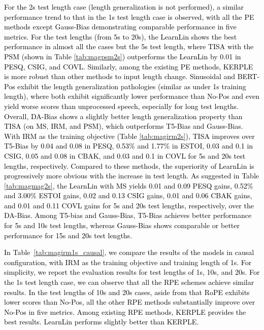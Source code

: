 \documentclass[journal]{IEEEtran}
\begin{document}
\textcolor{black}{\textcolor{black}{For the 2s test length case (length generalization is not performed), a similar performance trend to that in the 1s test length case is observed, with all the PE methods except Gauss-Bias demonstrating comparable performance in five metrics.} For the test lengths (from 5s to 20s), the LearnLin shows the best performance in almost all the cases but the 5s test length, where TISA with the PSM (shown in Table \ref{tab:magpsm2s}) outperforms the LearnLin by 0.01 in PESQ, CSIG, and COVL. Similarly, among the existing PE methods, KERPLE is more robust than other methods to input length change. Sinusoidal and BERT-Pos exhibit the length generalization pathologies (similar as under 1s training length), where both exhibit significantly lower performance than No-Pos and even yield worse scores than unprocessed speech, especially for long test lengths. Overall, DA-Bias shows a slightly better length generalization property than TISA (on MS, IRM, and PSM), which outperforms T5-Bias and Gauss-Bias. With IRM as the training objective (Table \ref{tab:magirm2s}), TISA improves over T5-Bias by 0.04 and 0.08 in PESQ, 0.53\% and 1.77\% in ESTOI, 0.03 and 0.1 in CSIG, 0.05 and 0.08 in CBAK, and 0.03 and 0.1 in COVL for 5s and 20s test lengths, respectively. Compared to these methods, the superiority of LearnLin is progressively more obvious with the increase in test length. As suggested in Table \ref{tab:magmag2s}, the LearnLin with MS yields 0.01 and 0.09 PESQ gains, 0.52\% and 3.00\% ESTOI gains, 0.02 and 0.13 CSIG gains, 0.01 and 0.06 CBAK gains, and 0.01 and 0.11 COVL gains for 5s and 20s test lengths, respectively, over the DA-Bias. Among T5-bias and Gauss-Bias, T5-Bias achieves better performance for 5s and 10s test lengths, whereas Gauss-Bias shows comparable or better performance for 15s and 20s test lengths.}

\textcolor{black}{In Table~\ref{tab:magirm1s_causal}, we compare the results of the models in causal configuration, with IRM as the training objective and training length of 1s. For simplicity, we report the evaluation results for test lengths of 1s, 10s, and 20s. For the 1s test length case, we can observe that all the RPE schemes achieve similar results. In the test lengths of 10s and 20s cases, aside from that RoPE exhibits lower scores than No-Pos, all the other RPE methods substantially improve over No-Pos in five metrics. Among existing RPE methods, KERPLE provides the best results. LearnLin performs slightly better than KERPLE.}
\end{document}
